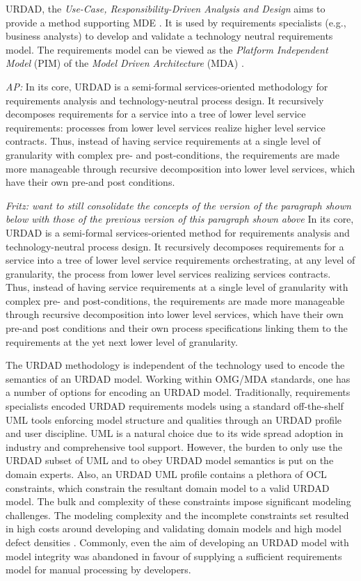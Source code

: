 URDAD, the {\em Use-Case, Responsibility-Driven Analysis and Design} \cite{fritz_solms_technology_2007} aims to provide a method supporting MDE \cite{solms_urdad_2010}. It is used by requirements specialists (e.g., business analysts) to develop and validate a technology neutral requirements model. The requirements model can be viewed as the {\em Platform Independent Model} (PIM) of the {\em Model Driven Architecture} (MDA) \cite{solms_urdad_2010}.

\emph{AP:}
In its core, URDAD is a semi-formal services-oriented methodology for requirements analysis and technology-neutral process design. It recursively decomposes requirements for a service into a tree of lower level service requirements: processes from lower level services realize higher level service contracts. Thus, instead of having service requirements at a single level of granularity with complex pre- and post-conditions, the requirements are made more manageable through recursive decomposition into lower level services, which have their own pre-and post conditions.

\emph{Fritz: want to still consolidate the concepts of the version of the paragraph shown below with those of the previous version of this paragraph shown above}
In its core, URDAD is a semi-formal services-oriented method for requirements analysis and technology-neutral process design. It recursively decomposes requirements for a service into a tree of lower level service requirements orchestrating, at any level of granularity, the process from lower level services realizing services contracts. Thus, instead of having service requirements at a single level of granularity with complex pre- and post-conditions, the requirements are made more manageable through recursive decomposition into lower level services, which have their own pre-and post conditions and their own process specifications linking them to the requirements at the yet next lower level of granularity.

The URDAD methodology is independent of the technology used to encode the semantics of an URDAD model. Working within OMG/MDA standards, one has a number of options for encoding an URDAD model. Traditionally, requirements specialists encoded URDAD requirements models using a standard off-the-shelf UML tools enforcing model structure and qualities through an URDAD profile and user discipline. UML is a natural choice due to its wide spread adoption in industry and comprehensive tool support. However, the burden to only use the URDAD subset of UML and to obey URDAD model semantics is put on the domain experts. Also, an URDAD UML profile contains a plethora of OCL constraints, which constrain the resultant domain model to a valid URDAD model. The bulk and complexity of these constraints impose significant modeling challenges. The modeling complexity and the incomplete constraints set resulted in high costs around developing and validating domain models and high model defect densities \cite{}. Commonly, even the aim of developing an URDAD model with model integrity was abandoned in favour of supplying a sufficient requirements model for manual processing by developers.

